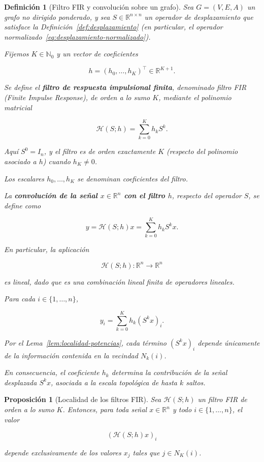 \documentclass[a4paper,openany,oneside,10pt]{report}
\theoremstyle{pnlTeorema}
\newtheorem{proposicion}{Proposición}[section]
\theoremstyle{pnlDefinicion}
\newtheorem{definicion}{Definición}[section]
\theoremstyle{pnlObservacion}
\begin{document}
\begin{definicion}[Filtro FIR y convolución sobre un grafo]\label{def:filtro-fir}
Sea \(G=(V,E,A)\) un grafo no dirigido ponderado, y sea \(S\in\mathbb R^{n\times n}\) un operador de desplazamiento que satisface la Definición~\ref{def:desplazamiento} (en particular, el operador normalizado~\eqref{eq:desplazamiento-normalizado}).

Fijemos \(K\in\mathbb N_0\) y un vector de coeficientes

\[
h=(h_0,\ldots,h_K)^\top\in\mathbb R^{K+1}.
\]

Se define el \textbf{filtro de respuesta impulsional finita}, denominado filtro FIR (\emph{Finite Impulse Response}), de orden a lo sumo \(K\), mediante el polinomio matricial

\begin{equation}\label{eq:filtro-fir}
\mathcal H(S;h)=\sum_{k=0}^{K}h_kS^k.
\end{equation}

Aquí \(S^0=I_n\), y el filtro es de orden exactamente \(K\) (respecto del polinomio asociado a \(h\)) cuando \(h_K\ne0\).

Los escalares \(h_0,\ldots,h_K\) se denominan \emph{coeficientes del filtro}.

La \textbf{convolución de la señal \(x\in\mathbb R^n\) con el filtro \(h\)}, respecto del operador \(S\), se define como

\[
y=\mathcal H(S;h)x
=\sum_{k=0}^{K}h_kS^kx.
\]

En particular, la aplicación

\[
\mathcal H(S;h):\mathbb R^n\longrightarrow\mathbb R^n
\]

es lineal, dado que es una combinación lineal finita de operadores lineales.

Para cada \(i\in\{1,\ldots,n\}\),

\[
y_i=
\sum_{k=0}^{K}h_k(S^kx)_i.
\]

Por el Lema~\ref{lem:localidad-potencias}, cada término \((S^kx)_i\) depende únicamente de la información contenida en la vecindad \(N_k(i)\).

En consecuencia, el coeficiente \(h_k\) determina la contribución de la señal desplazada \(S^kx\), asociada a la escala topológica de hasta \(k\) saltos.
\end{definicion}


\begin{proposicion}[Localidad de los filtros FIR]\label{prop:localidad-fir}
Sea \(\mathcal H(S;h)\) un filtro FIR de orden a lo sumo \(K\). Entonces, para toda señal \(x\in\mathbb R^n\) y todo \(i\in\{1,\ldots,n\}\), el valor

\[
(\mathcal H(S;h)x)_i
\]

depende exclusivamente de los valores \(x_j\) tales que \(j\in N_K(i)\).

\end{proposicion}
\end{document}

